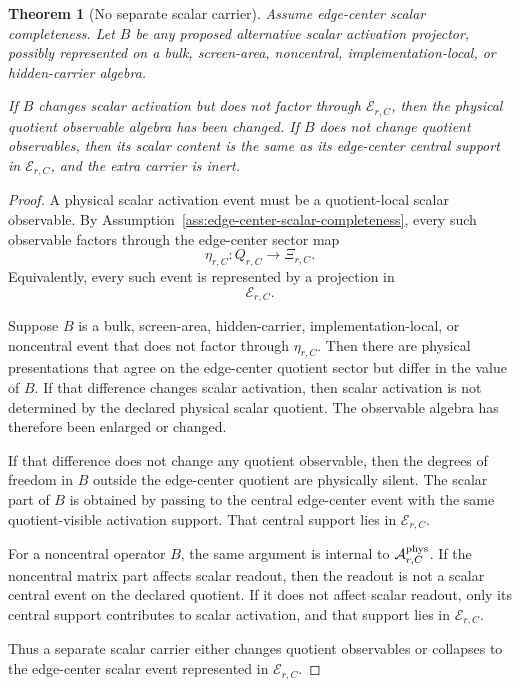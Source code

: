 \documentclass[11pt]{article}
\newtheorem{theorem}{Theorem}[section]
\theoremstyle{remark}
\theoremstyle{plain}
\begin{document}
\begin{theorem}[No separate scalar carrier]
\label{thm:no-separate-scalar-carrier}
Assume edge-center scalar completeness. Let \(B\) be any proposed alternative
scalar activation projector, possibly represented on a bulk, screen-area,
noncentral, implementation-local, or hidden-carrier algebra.

If \(B\) changes scalar activation but does not factor through
\(\mathcal E_{r,C}\), then the physical quotient observable algebra has been
changed. If \(B\) does not change quotient observables, then its scalar content
is the same as its edge-center central support in \(\mathcal E_{r,C}\), and
the extra carrier is inert.
\end{theorem}

\begin{proof}
A physical scalar activation event must be a quotient-local scalar observable.
By Assumption~\ref{ass:edge-center-scalar-completeness}, every such observable
factors through the edge-center sector map
\[
\eta_{r,C}:Q_{r,C}\to\Xi_{r,C}.
\]
Equivalently, every such event is represented by a projection in
\[
\mathcal E_{r,C}.
\]

Suppose \(B\) is a bulk, screen-area, hidden-carrier, implementation-local, or
noncentral event that does not factor through \(\eta_{r,C}\). Then there are
physical presentations that agree on the edge-center quotient sector but differ
in the value of \(B\). If that difference changes scalar activation, then
scalar activation is not determined by the declared physical scalar quotient.
The observable algebra has therefore been enlarged or changed.

If that difference does not change any quotient observable, then the degrees of
freedom in \(B\) outside the edge-center quotient are physically silent. The
scalar part of \(B\) is obtained by passing to the central edge-center event
with the same quotient-visible activation support. That central support lies
in \(\mathcal E_{r,C}\).

For a noncentral operator \(B\), the same argument is internal to
\(\mathcal A^{\rm phys}_{r,C}\). If the noncentral matrix part affects scalar
readout, then the readout is not a scalar central event on the declared
quotient. If it does not affect scalar readout, only its central support
contributes to scalar activation, and that support lies in
\(\mathcal E_{r,C}\).

Thus a separate scalar carrier either changes quotient observables or collapses
to the edge-center scalar event represented in \(\mathcal E_{r,C}\).
\end{proof}
\end{document}
